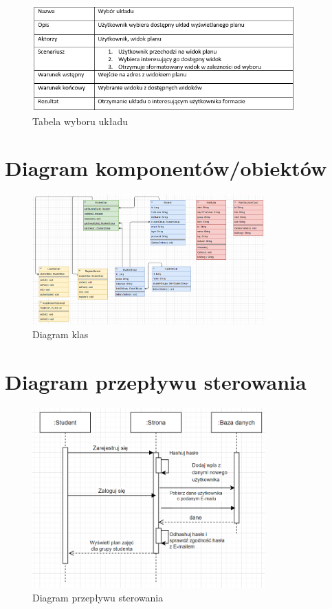 \documentclass[a4paper,11pt]{uzreport}
\begin{document}
     \begin{figure}[ht!]
        \centering
        \includegraphics[width=0.9\textwidth]{pictures/wybor ukladu.PNG}
        \caption{Tabela wyboru układu}
        \label{fig9}
     \end{figure}

\clearpage
\section{Diagram komponentów/obiektów}

	\begin{figure}[ht!]
        	\centering
        	\includegraphics[width=0.8\textwidth]{pictures/Diagram_klas.png}
        	\caption{Diagram klas}
       		\label{diagram_klas}
     	\end{figure}

\section{Diagram przepływu sterowania}
	\begin{figure}[ht!]
        	\centering
        	\includegraphics[width=0.8\textwidth]{pictures/diagram.png}
        	\caption{Diagram przepływu sterowania}
       		\label{diagram_przeplywu_sterowania}
     	\end{figure}
\end{document}
